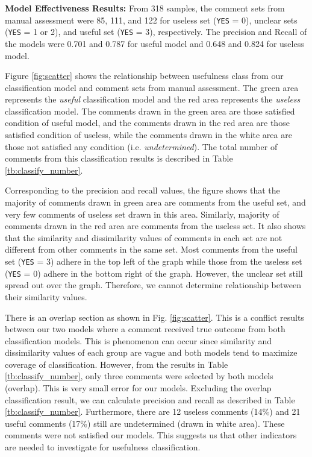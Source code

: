 \textbf{Model Effectiveness Results:} From 318 samples, the comment sets from manual assessment were 85, 111, and 122 for useless set (\texttt{YES} = 0), unclear sets (\texttt{YES} = 1 or 2), and useful set (\texttt{YES} = 3), respectively. The precision and Recall of the models were 0.701 and 0.787 for useful model and 0.648 and 0.824 for useless model. 

Figure \ref{fig:scatter} shows the relationship between usefulness class from our classification model and comment sets from manual assessment. 
The green area represents the \emph{useful} classification model and the red area represents the \emph{useless} classification model. The comments drawn in the green area are those satisfied condition of useful model, and the comments drawn in the red area are those satisfied condition of useless, while the comments drawn in the white area are those not satisfied any condition (i.e. \emph{undetermined}). 
The total number of comments from this classification results is described in Table \ref{tb:classify_number}. 



Corresponding to the precision and recall values, the figure shows that the majority of comments drawn in green area are comments from the useful set, and very few comments of useless set drawn in this area.
Similarly, majority of comments drawn in the red area are comments from the useless set.
It also shows that the similarity and dissimilarity values of comments in each set are not different from other comments in the same set.
Most comments from the useful set (\texttt{YES} = 3) adhere in the top left of the graph
while those from the useless set (\texttt{YES} = 0) adhere in the bottom right of the graph.
However, the unclear set still spread out over the graph.
Therefore, we cannot determine relationship between their similarity values.

There is an overlap section as shown in Fig. \ref{fig:scatter}.
This is a conflict results between our two models where a comment received true outcome from both classification models.  
This is phenomenon can occur since similarity and dissimilarity values of each group are vague and both  models tend to maximize coverage of classification.
However, from the results in Table \ref{tb:classify_number}, only three comments were selected by both models (overlap). This is very small error for our models.
Excluding the overlap classification result, we can calculate precision and recall as described in Table \ref{tb:classify_number}. Furthermore, there are 12 useless comments (14\%) and 21 useful comments (17\%) still are undetermined (drawn in white area). These comments were not satisfied our models. This suggests us that other indicators are needed to investigate for usefulness classification.

